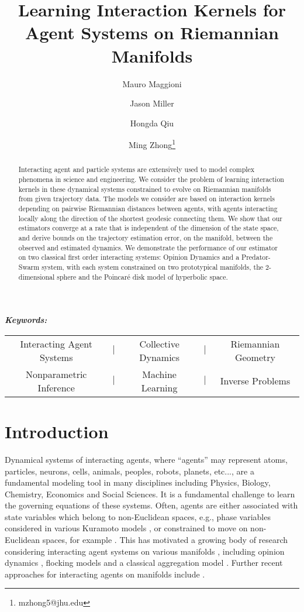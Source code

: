 \documentclass[11pt]{article}
\title{Learning Interaction Kernels for Agent Systems on Riemannian Manifolds}
\author[a,b]{Mauro Maggioni}
\author[a]{Jason Miller}
\author[a]{Hongda Qiu}
\author[a]{Ming Zhong\footnote{mzhong5@jhu.edu}}
\affil[a]{Department of Applied Mathematics $\&$ Statistics}
\affil[b]{Department of Mathematics}
\affil[ ]{Johns Hopkins University, Baltimore, MD $21218$, USA}
\providecommand{\keywords}[1]
{
\small	
\textbf{\textit{Keywords: }} #1
}
\begin{document}
%
\maketitle
%
\begin{abstract}
Interacting agent and particle systems are extensively used to model complex phenomena in science and engineering.  
We consider the problem of learning interaction kernels in these dynamical systems constrained to evolve on Riemannian manifolds from given trajectory data.  
The models we consider are based on interaction kernels depending on pairwise Riemannian distances between agents, with agents interacting locally along the direction of the shortest geodesic connecting them.
We show that our estimators converge at a rate that is independent of the dimension of the state space, and derive bounds on the trajectory estimation error, on the manifold, between the observed and estimated dynamics.
We demonstrate the performance of our estimator on two classical first order interacting systems: Opinion Dynamics and a Predator-Swarm system, with each system constrained on two prototypical manifolds, the $2$-dimensional sphere and the Poincar\'e disk model of hyperbolic space.
\end{abstract}
%
\newcommand{\theKeywords}{
\small{\begin{tabular}{c c c c c}
Interacting Agent Systems & $|$ & Collective Dynamics & $|$ & Riemannian Geometry \\
Nonparametric Inference  & $|$ & Machine Learning & $|$ & Inverse Problems
\end{tabular}}}
%
\keywords{\theKeywords} 
%
\section{Introduction}\label{sec:intro}
%
Dynamical systems of interacting agents, where ``agents'' may represent atoms, particles, neurons, cells, animals, peoples, robots, planets, etc..., are a fundamental modeling tool in many disciplines including Physics, Biology, Chemistry, Economics and Social Sciences.   It is a fundamental challenge to learn the governing equations of these systems.   Often, agents are either associated with state variables which belong to non-Euclidean spaces, e.g., phase variables considered in various Kuramoto models \cite{kuramoto1975, Strogatz2000}, or constrained to move on non-Euclidean spaces, for example  \cite{ahn2020emergent}.  This has motivated a growing body of research considering interacting agent systems on various manifolds \cite{LLM2018, CLP2014, Sarlette}, including opinion dynamics \cite{OpinionDynamicsAylin2017}, flocking models \cite{ahn2020emergent} and a classical aggregation model \cite{AggregationModelC_Fetecau_2019}.   Further recent approaches for interacting agents on manifolds include \cite{yang2020inference,soize2020probabilistic}.  
\end{document}
